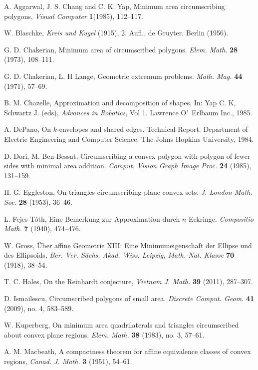 \documentclass [10pt,oneside]{amsart}
\theoremstyle{definition}
\theoremstyle{plain}
\begin{document}
\begin{thebibliography}{99}
 A. Aggarwal, J. S. Chang and C. K. Yap,  Minimum area circumscribing polygons, \emph{Visual Computer} {\bf 1}(1985), 112--117.

W. Blaschke, \emph{Kreis und Kugel} (1915), 2. Aufl., de Gruyter, Berlin (1956).

G. D. Chakerian, Minimum area of circumscribed polygons. \emph{Elem.
Math.} {\bf 28} (1973), 108--111.

 G. D. Chakerian, L. H Lange, Geometric extremum problems.
\emph{Math. Mag.} {\bf 44} (1971), 57--69.


 B. M. Chazelle, Approximation and decomposition of shapes, In: Yap C. K, Schwartz J. (eds), \emph{Advances in Robotics}, Vol 1. Lawrence O'~Erlbaum Inc., 1985.

 A. DePano,  On $k$-envelopes and shared edges. Technical
Report. Department of Electric Engineering and Computer Science. The Johns Hopkins University, 1984.

 D. Dori,  M. Ben-Bessat, Circumscribing a convex polygon
with polygon of fewer sides with minimal area addition.
\emph{Comput. Vision Graph Image Proc.} {\bf 24} (1985), 131--159.

 H. G. Eggleston, On triangles circumscribing plane convex sets.
\emph{J. London Math. Soc.} {\bf 28} (1953), 36--46.

 L. Fejes T\'{o}th, Eine Bemerkung zur Approximation durch
$n$-Eckringe. \emph{Compositio Math.} {\bf 7} (1940), 474--476.

 W. Gross, \"{U}ber affine Geometrie XIII: Eine
Minimumeigenschaft der Ellipse und des Ellipsoids, {\it Ber. Ver.
S\"{a}chs. Akad. Wiss. Leipzig, Math.-Nat. Klasse} {\bf 70} (1918),
38--54.

 T. C. Hales, On the Reinhardt conjecture, \emph{Vietnam J. Math.} {\bf 39} (2011), 287--307.

 D. Ismailescu, Circumscribed polygons of small area. \emph{Discrete Comput. Geom.} {\bf 41} (2009), no. 4, 583--589.

 W. Kuperberg,  On minimum area quadrilaterals and triangles
circumscribed about convex plane regions. \emph{Elem. Math.} {\bf 38}
(1983), no. 3, 57--61.

 A. M. Macbeath, A compactness theorem for affine equivalence classes of convex regions,\emph{ Canad. J.
Math.} {\bf 3} (1951), 54--61.


\end{thebibliography}
\end{document}
